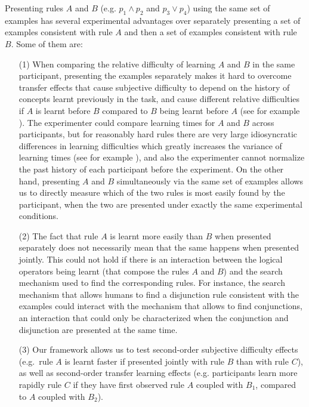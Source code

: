 Presenting rules $A$ and $B$ (e.g. $p_1 \land p_2$ and $p_3 \lor p_4$) using the same set of examples has several experimental advantages over separately presenting a set of examples consistent with rule $A$ and then a set of examples consistent with rule $B$. Some of them are: 


\begin{enumerate}
\item [(1)] When comparing the relative difficulty of learning $A$ and $B$ in the same participant, presenting the examples separately makes it hard to overcome transfer effects that cause subjective difficulty to depend on the history of concepts learnt previously in the task, and cause different relative difficulties if $A$ is learnt before $B$ compared to $B$ being learnt before $A$ (see for example \cite{tano2020towards}). The experimenter could compare learning times for $A$ and $B$ across participants, but for reasonably hard rules there are very large idiosyncratic differences in learning difficulties which greatly increases the variance of learning times (see for example \cite{feldman2000minimization}), and also the experimenter cannot normalize the past history of each participant before the experiment. On the other hand, presenting $A$ and $B$ simultaneously via the same set of examples allows us to directly measure which of the two rules is most easily found by the participant, when the two are presented under exactly the same experimental conditions.
\item [(2)] The fact that rule $A$ is learnt more easily than $B$ when presented separately does not necessarily mean that the same happens when presented jointly. This could not hold if there is an interaction between the logical operators being learnt (that compose the rules $A$ and $B$) and the search mechanism used to find the corresponding rules. For instance, the search mechanism that allows humans to find a disjunction rule consistent with the examples could interact with the mechanism that allows to find conjunctions, an interaction that could only be characterized when the conjunction and disjunction are presented at the same time.
\item [(3)] Our framework allows us to test second-order subjective difficulty effects (e.g.\ rule $A$ is learnt faster if presented jointly with rule $B$ than with rule $C$), as well as second-order transfer learning effects (e.g. participants learn more rapidly rule $C$ if they have first observed rule $A$ coupled with $B_1$, compared to $A$ coupled with $B_2$).

\end{enumerate}
